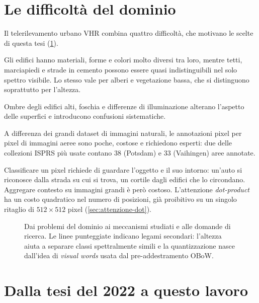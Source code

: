 \section{Le difficoltà del dominio}
\label{sec:difficolta}

Il telerilevamento urbano VHR combina quattro difficoltà, che motivano le scelte di questa tesi
(\cref{fig:filo-logico}).

\begin{description}[style=nextline, leftmargin=1.2em]
  \item[Variabilità intra-classe alta e inter-classe bassa.] Gli edifici hanno materiali,
  forme e colori molto diversi tra loro, mentre tetti, marciapiedi e strade in cemento possono
  essere quasi indistinguibili nel solo spettro visibile. Lo stesso vale per alberi e
  vegetazione bassa, che si distinguono soprattutto per l'altezza.
  \item[Condizioni di ripresa.] Ombre degli edifici alti, foschia e differenze di
  illuminazione alterano l'aspetto delle superfici e introducono confusioni sistematiche.
  \item[Scarsità di etichette.] A differenza dei grandi dataset di immagini naturali, le
  annotazioni pixel per pixel di immagini aeree sono poche, costose e richiedono esperti: due
  delle collezioni ISPRS più usate contano 38 (Potsdam) e 33 (Vaihingen) aree annotate.
  \item[Contesto ampio.] Classificare un pixel richiede di guardare l'oggetto e il suo intorno:
  un'auto si riconosce dalla strada su cui si trova, un cortile dagli edifici che lo
  circondano. Aggregare contesto su immagini grandi è però costoso. L'attenzione
  \emph{dot-product} ha un costo quadratico nel numero di posizioni, già proibitivo su un
  singolo ritaglio di $512\times512$ pixel (\cref{sec:attenzione-dot}).
\end{description}

\begin{figure}[t]
  \centering
  \resizebox{\linewidth}{!}{}
  \caption[Dai problemi del dominio alle domande di ricerca]{Dai problemi del dominio ai
    meccanismi studiati e alle domande di ricerca. Le linee punteggiate indicano legami
    secondari: l'altezza aiuta a separare classi spettralmente simili e la quantizzazione nasce
    dall'idea di \emph{visual words} usata dal pre-addestramento OBoW.}
  \label{fig:filo-logico}
\end{figure}

\section{Dalla tesi del 2022 a questo lavoro}
\label{sec:da-2022}

